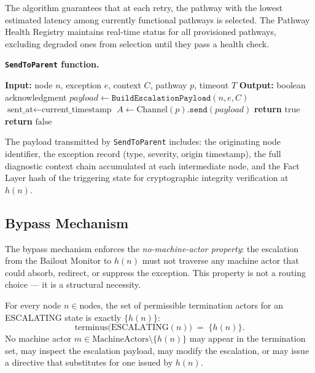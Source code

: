 The algorithm guarantees that at each retry, the pathway with the lowest estimated latency among currently functional pathways is selected. The Pathway Health Registry maintains real-time status for all provisioned pathways, excluding degraded ones from selection until they pass a health check.

\medskip
\noindent\textbf{\texttt{SendToParent} function.}
\begin{algorithmic}
\STATE \textbf{Input:} node $n$, exception $e$, context $C$, pathway $p$, timeout $T$
\STATE \textbf{Output:} boolean acknowledgment
\STATE
\STATE $payload \leftarrow \texttt{BuildEscalationPayload}(n, e, C)$
\STATE $\text{sent\_at} \leftarrow \text{current\_timestamp}$
\STATE $A \leftarrow \text{Channel}(p). \texttt{send}(payload)$
\STATE
\STATE {}
        \STATE \textbf{return} $\text{true}$
    \ENDIF
\ENDWAITFOR
\STATE \textbf{return} $\text{false}$
\end{algorithmic}

The payload transmitted by \texttt{SendToParent} includes: the originating node identifier, the exception record (type, severity, origin timestamp), the full diagnostic context chain accumulated at each intermediate node, and the Fact Layer hash of the triggering state for cryptographic integrity verification at $h(n)$.

\subsection{Bypass Mechanism}\label{sec:bypass}

The bypass mechanism enforces the \emph{no-machine-actor property}: the escalation from the Bailout Monitor to $h(n)$ must not traverse any machine actor that could absorb, redirect, or suppress the exception. This property is not a routing choice — it is a structural necessity.

\begin{definition}\label{def:bypass}
For every node $n \in \text{nodes}$, the set of permissible termination actors for an ESCALATING state is exactly $\{h(n)\}$:
\begin{equation}
\text{terminus}\bigl(\text{ESCALATING}(n)\bigr) \;=\; \{h(n)\}. \tag{BP}
\end{equation}
No machine actor $m \in \text{MachineActors} \setminus \{h(n)\}$ may appear in the termination set, may inspect the escalation payload, may modify the escalation, or may issue a directive that substitutes for one issued by $h(n)$.
\end{definition}

